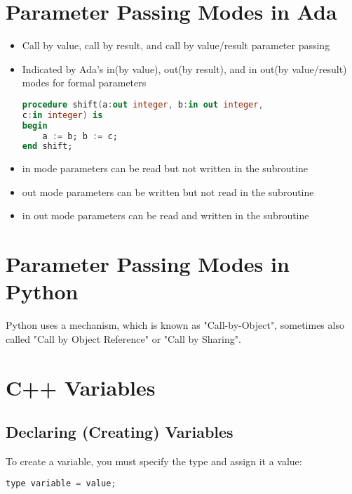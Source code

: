 \documentclass[12pt]{article}
\begin{document}
\section{Parameter Passing Modes in Ada}

\begin{itemize}
	\item Call by value, call by result, and call by value/result parameter passing
	\item Indicated by Ada’s in(by value), out(by result), and in out(by value/result) modes for formal parameters
\begin{lstlisting}[language=Ada]
procedure shift(a:out integer, b:in out integer,
c:in integer) is
begin
	a := b; b := c;
end shift;
\end{lstlisting}
	\item in mode parameters can be read but not written in the subroutine
	\item out mode parameters can be written but not read in the subroutine
	\item in out mode parameters can be read and written in the subroutine
\end{itemize}




\section{Parameter Passing Modes in Python}

Python uses a mechanism, which is known as "Call-by-Object", sometimes also called "Call by Object Reference" or "Call by Sharing".







\section{C++ Variables}


\subsection{Declaring (Creating) Variables}

To create a variable, you must specify the type and assign it a value:

\lstset{style=mystyle}
\begin{lstlisting}[language=C++, caption=C++ example]
type variable = value;
\end{lstlisting}
\end{document}
